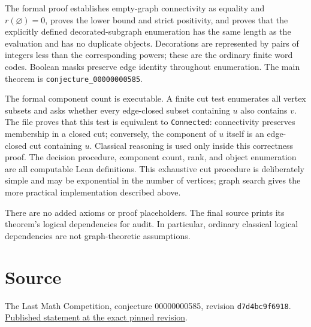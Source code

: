 \documentclass[11pt]{article}
\begin{document}
The formal proof establishes empty-graph connectivity as equality and
$r(\varnothing)=0$, proves the lower bound and strict positivity, and proves
that the explicitly defined decorated-subgraph enumeration has the same
length as the evaluation and has no duplicate objects. Decorations are represented by pairs of integers
less than the corresponding powers; these are the ordinary finite word
codes. Boolean masks preserve edge identity throughout enumeration.
The main theorem is \texttt{conjecture\_00000000585}.

The formal component count is executable. A finite cut test enumerates
all vertex subsets and asks whether every edge-closed subset containing $u$
also contains $v$. The file proves that this test is equivalent to
\texttt{Connected}: connectivity preserves membership in a closed cut;
conversely, the component of $u$ itself is an edge-closed cut containing $u$.
Classical reasoning is used only inside this correctness proof. The decision
procedure, component count, rank, and object enumeration are all computable
Lean definitions. This exhaustive cut procedure is deliberately simple and
may be exponential in the number of vertices; graph search gives the more
practical implementation described above.

There are no added axioms or proof placeholders. The final source prints
its theorem's logical dependencies for audit. In particular, ordinary
classical logical dependencies are not graph-theoretic assumptions.

\section*{Source}
The Last Math Competition, conjecture 00000000585, revision
\texttt{d7d4bc9f6918}. \href{https://github.com/The-Last-Math-Competition/The-Last-Math-Competition/blob/d7d4bc9f6918401d3fb22c6e473df63eba5dbb78/conjectures/00000000585.md}{Published statement at the exact pinned revision}.
\end{document}
